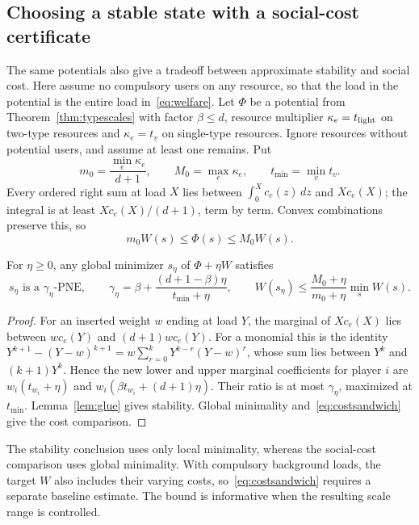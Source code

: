 \documentclass[manuscript,review,anonymous]{acmart}
\newcommand{\PNE}{\mathrm{PNE}}
\begin{document}
\subsection{Choosing a stable state with a social-cost certificate}\label{sec:regularization}
The same potentials also give a tradeoff between approximate stability and social cost. Here assume no compulsory users on any resource, so that the load in the potential is the entire load in~\eqref{eq:welfare}. Let $\Phi$ be a potential from Theorem~\ref{thm:typescales} with factor $\beta\le d$, resource multiplier $\kappa_e=t_{\rm light}$ on two-type resources and $\kappa_e=t_v$ on single-type resources. Ignore resources without potential users, and assume at least one remains. Put
\[
 m_0=\frac{\min_e\kappa_e}{d+1},\qquad
 M_0=\max_e\kappa_e,\qquad t_{\min}=\min_vt_v.
\]
Every ordered right sum at load $X$ lies between $\int_0^Xc_e(z)\,dz$ and $Xc_e(X)$; the integral is at least $Xc_e(X)/(d+1)$, term by term. Convex combinations preserve this, so
\begin{equation}\label{eq:costsandwich}
 m_0W(s)\le\Phi(s)\le M_0W(s).
\end{equation}
\begin{proposition}\label{prop:regularization}
For $\eta\ge0$, any global minimizer $s_\eta$ of $\Phi+\eta W$ satisfies
\begin{equation}\label{eq:regguarantees}
 s_\eta\text{ is a }\gamma_\eta\text{-}\PNE,\qquad
 \gamma_\eta=\beta+\frac{(d+1-\beta)\eta}{t_{\min}+\eta},\qquad
 W(s_\eta)\le\frac{M_0+\eta}{m_0+\eta}\min_sW(s).
\end{equation}
\end{proposition}
\begin{proof}
For an inserted weight $w$ ending at load $Y$, the marginal of $Xc_e(X)$ lies between $wc_e(Y)$ and $(d+1)wc_e(Y)$. For a monomial this is the identity $Y^{k+1}-(Y-w)^{k+1}=w\sum_{r=0}^kY^{k-r}(Y-w)^r$, whose sum lies between $Y^k$ and $(k+1)Y^k$. Hence the new lower and upper marginal coefficients for player $i$ are $w_i(t_{w_i}+\eta)$ and $w_i(\beta t_{w_i}+(d+1)\eta)$. Their ratio is at most $\gamma_\eta$, maximized at $t_{\min}$. Lemma~\ref{lem:glue} gives stability. Global minimality and~\eqref{eq:costsandwich} give the cost comparison.
\end{proof}
The stability conclusion uses only local minimality, whereas the social-cost comparison uses global minimality. With compulsory background loads, the target $W$ also includes their varying costs, so~\eqref{eq:costsandwich} requires a separate baseline estimate. The bound is informative when the resulting scale range is controlled.
\end{document}

